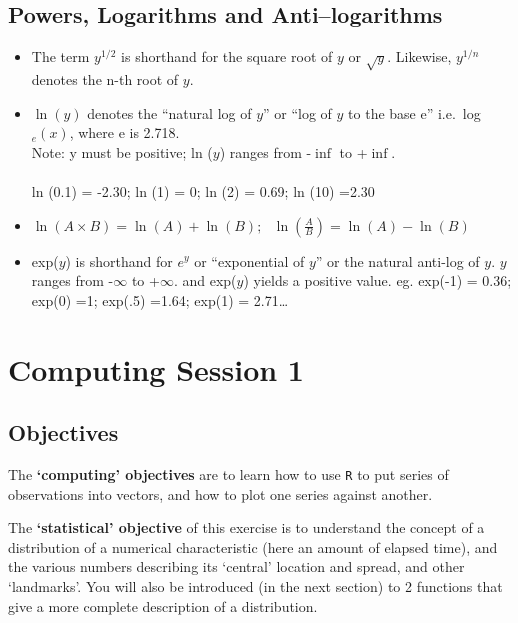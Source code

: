 \documentclass[]{book}
\begin{document}
\hypertarget{powers-logarithms-and-antilogarithms}{%
\section{Powers, Logarithms and Anti--logarithms}\label{powers-logarithms-and-antilogarithms}}

\begin{itemize}
\item
  The term \(y^{1/2}\) is shorthand for the square root of \(y\) or \(\sqrt{y}\). Likewise, \(y^{1/n}\) denotes the n-th root of \(y\).
\item
  \(\ln (y)\) denotes the ``natural log of \(y\)'' or ``log of \(y\) to
  the base e'' i.e.~log\(_e(x)\), where e is 2.718.\\
  Note: y must be positive; ln (\(y\)) ranges from -\(\inf\) to +\(\inf\).\\
  \hspace*{0.333em}\\
  ln (0.1) = -2.30; ln (1) = 0; ln (2) = 0.69; ln (10) =2.30
\item
  \(\ln(A \times B) = \ln(A) + \ln(B); \ \ \ \ln(\frac{A}{B}) = \ln(A) - \ln(B)\)
\item
  exp(\(y\)) is shorthand for \(e^y\) or ``exponential of \(y\)'' or the natural anti-log of \(y\). \(y\) ranges from -\(\infty\) to +\(\infty\). and exp(\(y\)) yields a positive value. eg. exp(-1) = 0.36; exp(0) =1; exp(.5) =1.64; exp(1) = 2.71\ldots{}
\end{itemize}

\hypertarget{computing01}{%
\chapter{Computing Session 1}\label{computing01}}

\hypertarget{objectives-3}{%
\section{Objectives}\label{objectives-3}}

The \textbf{`computing' objectives} are to learn how to use \texttt{R} to put series of observations into vectors, and how to plot one series against another.

The \textbf{`statistical' objective} of this exercise is to understand the concept of a distribution of a numerical characteristic (here an amount of elapsed time), and the various numbers describing its `central' location and spread, and other `landmarks'. You will also be introduced (in the next section) to 2 functions that give a more complete description of a distribution.
\end{document}
